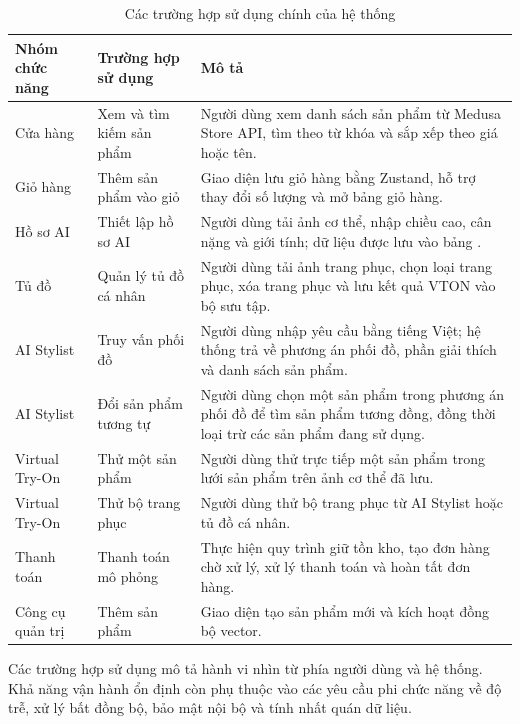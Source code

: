 \begin{table}[H]
\centering
\small
\caption{Các trường hợp sử dụng chính của hệ thống}
\begin{tabularx}{\textwidth}{L{2.7cm}L{3.7cm}Y}
\toprule
\textbf{Nhóm chức năng} & \textbf{Trường hợp sử dụng} & \textbf{Mô tả} \\
\midrule
Cửa hàng & Xem và tìm kiếm sản phẩm & Người dùng xem danh sách sản phẩm từ Medusa Store API, tìm theo từ khóa và sắp xếp theo giá hoặc tên. \\
\addlinespace
Giỏ hàng & Thêm sản phẩm vào giỏ & Giao diện lưu giỏ hàng bằng Zustand, hỗ trợ thay đổi số lượng và mở bảng giỏ hàng. \\
\addlinespace
Hồ sơ AI & Thiết lập hồ sơ AI & Người dùng tải ảnh cơ thể, nhập chiều cao, cân nặng và giới tính; dữ liệu được lưu vào bảng . \\
\addlinespace
Tủ đồ & Quản lý tủ đồ cá nhân & Người dùng tải ảnh trang phục, chọn loại trang phục, xóa trang phục và lưu kết quả VTON vào bộ sưu tập. \\
\addlinespace
AI Stylist & Truy vấn phối đồ & Người dùng nhập yêu cầu bằng tiếng Việt; hệ thống trả về phương án phối đồ, phần giải thích và danh sách sản phẩm. \\
\addlinespace
AI Stylist & Đổi sản phẩm tương tự & Người dùng chọn một sản phẩm trong phương án phối đồ để tìm sản phẩm tương đồng, đồng thời loại trừ các sản phẩm đang sử dụng. \\
\addlinespace
Virtual Try-On & Thử một sản phẩm & Người dùng thử trực tiếp một sản phẩm trong lưới sản phẩm trên ảnh cơ thể đã lưu. \\
\addlinespace
Virtual Try-On & Thử bộ trang phục & Người dùng thử bộ trang phục từ AI Stylist hoặc tủ đồ cá nhân. \\
\addlinespace
Thanh toán & Thanh toán mô phỏng & Thực hiện quy trình giữ tồn kho, tạo đơn hàng chờ xử lý, xử lý thanh toán và hoàn tất đơn hàng. \\
\addlinespace
Công cụ quản trị & Thêm sản phẩm & Giao diện  tạo sản phẩm mới và kích hoạt đồng bộ vector. \\
\bottomrule
\end{tabularx}
\end{table}



\medskip

Các trường hợp sử dụng mô tả hành vi nhìn từ phía người dùng và hệ thống. Khả năng vận hành ổn định còn phụ thuộc vào các yêu cầu phi chức năng về độ trễ, xử lý bất đồng bộ, bảo mật nội bộ và tính nhất quán dữ liệu.


